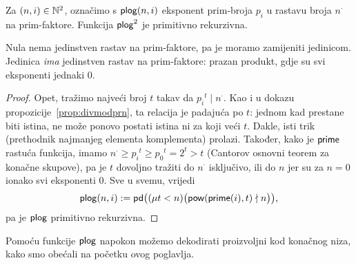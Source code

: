 \begin{lema}\label{lm:plogprn}
Za $(n,i)\in{\mathbb N}^2$, označimo s $\mathsf{plog}(n,i)$ eksponent prim-broja $p_i$ u rastavu broja $n^\cdot$ na prim-faktore. Funkcija $\mathsf{plog}^2$ je primitivno rekurzivna.
\end{lema}
Nula nema jedinstven rastav na prim-faktore, pa je moramo zamijeniti jedinicom. Jedinica \emph{ima} jedinstven rastav na prim-faktore: prazan produkt, gdje su svi eksponenti jednaki $0$.
\begin{proof}
Opet, tražimo najveći broj $t$ takav da ${p_i}^t\mid n^\cdot$. Kao i u dokazu propozicije~\ref{prop:divmodprn}, ta relacija je padajuća po $t$: jednom kad prestane biti istina, ne može ponovo postati istina ni za koji veći $t$. Dakle, isti trik (prethodnik najmanjeg elementa komplementa) prolazi. Također, kako je $\mathsf{prime}$ rastuća funkcija, imamo $n^\cdot\ge{p_i}^t\ge{p_0}^t=2^t>t$ (Cantorov osnovni teorem za konačne skupove), pa je $t$ dovoljno tražiti do $n^\cdot$ isključivo, ili do $n$ jer su za $n=0$ ionako svi eksponenti $0$. Sve u svemu, vrijedi
\begin{equation}
    \mathsf{plog}(n,i):=\mathsf{pd}\bigl((\mu t<n)\bigl(\mathsf{pow}(\mathsf{prime}(i),t)\nmid n\bigr)\bigr)\text,
\end{equation}
pa je $\mathsf{plog}$ primitivno rekurzivna.
\end{proof}

Pomoću funkcije $\mathsf{plog}$ napokon možemo dekodirati proizvoljni kod konačnog niza, kako smo obećali na početku ovog poglavlja.

